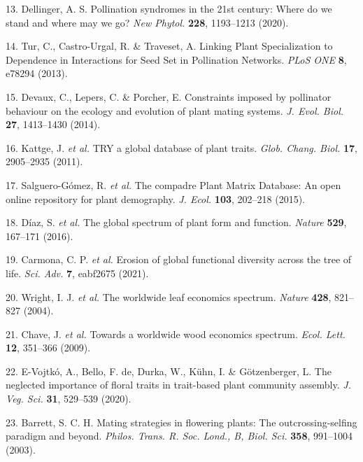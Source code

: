 \documentclass[
  12pt,
  a4paper,
]{article}
\begin{document}
\leavevmode\hypertarget{ref-dellinger2020}{}%
13. Dellinger, A. S. Pollination syndromes in the 21st century: Where do we stand and where may we go? \emph{New Phytol.} \textbf{228}, 1193--1213 (2020).

\leavevmode\hypertarget{ref-tur2013}{}%
14. Tur, C., Castro-Urgal, R. \& Traveset, A. Linking Plant Specialization to Dependence in Interactions for Seed Set in Pollination Networks. \emph{PLoS ONE} \textbf{8}, e78294 (2013).

\leavevmode\hypertarget{ref-devaux2014}{}%
15. Devaux, C., Lepers, C. \& Porcher, E. Constraints imposed by pollinator behaviour on the ecology and evolution of plant mating systems. \emph{J. Evol. Biol.} \textbf{27}, 1413--1430 (2014).

\leavevmode\hypertarget{ref-kattge2011}{}%
16. Kattge, J. \emph{et al.} TRY a global database of plant traits. \emph{Glob. Chang. Biol.} \textbf{17}, 2905--2935 (2011).

\leavevmode\hypertarget{ref-salguero2015}{}%
17. Salguero-Gómez, R. \emph{et al.} The compadre Plant Matrix Database: An open online repository for plant demography. \emph{J. Ecol.} \textbf{103}, 202--218 (2015).

\leavevmode\hypertarget{ref-diaz2016}{}%
18. Díaz, S. \emph{et al.} The global spectrum of plant form and function. \emph{Nature} \textbf{529}, 167--171 (2016).

\leavevmode\hypertarget{ref-carmona2021}{}%
19. Carmona, C. P. \emph{et al.} Erosion of global functional diversity across the tree of life. \emph{Sci. Adv.} \textbf{7}, eabf2675 (2021).

\leavevmode\hypertarget{ref-wright2004}{}%
20. Wright, I. J. \emph{et al.} The worldwide leaf economics spectrum. \emph{Nature} \textbf{428}, 821--827 (2004).

\leavevmode\hypertarget{ref-chave2009}{}%
21. Chave, J. \emph{et al.} Towards a worldwide wood economics spectrum. \emph{Ecol. Lett.} \textbf{12}, 351--366 (2009).

\leavevmode\hypertarget{ref-evojtko2020}{}%
22. E-Vojtkó, A., Bello, F. de, Durka, W., Kühn, I. \& Götzenberger, L. The neglected importance of floral traits in trait-based plant community assembly. \emph{J. Veg. Sci.} \textbf{31}, 529--539 (2020).

\leavevmode\hypertarget{ref-barrett2003}{}%
23. Barrett, S. C. H. Mating strategies in flowering plants: The outcrossing-selfing paradigm and beyond. \emph{Philos. Trans. R. Soc. Lond., B, Biol. Sci.} \textbf{358}, 991--1004 (2003).
\end{document}
